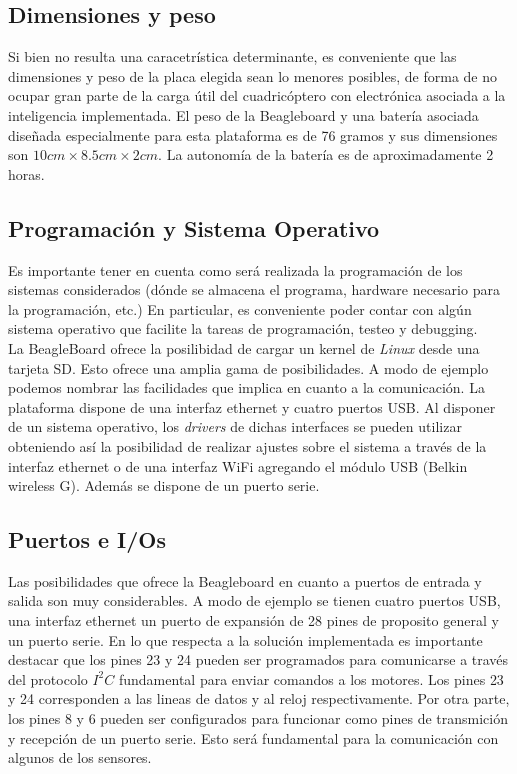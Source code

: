 \documentclass[main]{subfiles}
\begin{document}
\subsection*{Dimensiones y peso}

Si bien no resulta una caracetr\'istica determinante, es conveniente que las dimensiones y peso de la placa elegida sean lo menores posibles, de forma de no ocupar gran parte de la carga \'util del cuadric\'optero con electr\'onica asociada a la inteligencia implementada. El peso de la Beagleboard y una bater\'ia asociada diseñada especialmente para esta plataforma es de 76 gramos y sus dimensiones son $10cm\times8.5cm\times2cm$. La autonom\'ia de la bater\'ia es de aproximadamente 2 horas. \\

\subsection*{Programaci\'on y Sistema Operativo}

Es importante tener en cuenta como ser\'a realizada la programaci\'on de los sistemas considerados (d\'onde se almacena el programa, hardware necesario para la programaci\'on, etc.) En particular, es conveniente poder contar con alg\'un sistema operativo que facilite la tareas de programaci\'on, testeo y debugging.\\

La BeagleBoard ofrece la posilibidad de cargar un kernel de \emph{Linux} desde una tarjeta SD. Esto ofrece una amplia gama de posibilidades. A modo de ejemplo podemos nombrar las facilidades que implica en cuanto a la comunicaci\'on. La plataforma dispone de una interfaz ethernet y cuatro puertos USB. Al disponer de un sistema operativo, los \emph{drivers} de dichas interfaces se pueden utilizar obteniendo as\'i la posibilidad de realizar ajustes sobre el sistema a trav\'es de la interfaz ethernet o de una interfaz WiFi agregando el m\'odulo USB (Belkin wireless G). Adem\'as se dispone de un puerto serie. 

\subsection*{Puertos e I/Os}

Las posibilidades que ofrece la Beagleboard en cuanto a puertos de entrada y salida son muy considerables. A modo de ejemplo se tienen cuatro puertos USB, una interfaz ethernet un puerto de expansi\'on de 28 pines de proposito general y un puerto serie. En lo que respecta a la soluci\'on implementada es importante destacar que los pines 23 y 24 pueden ser programados para comunicarse a trav\'es del protocolo $I^2C$ fundamental para enviar comandos a los motores. Los pines 23 y 24 corresponden a las lineas de datos y al reloj respectivamente. Por otra parte, los pines 8 y 6 pueden ser configurados para funcionar como pines de transmici\'on y recepci\'on de un puerto serie. Esto ser\'a fundamental para la comunicaci\'on con algunos de los sensores.\\
\end{document}
